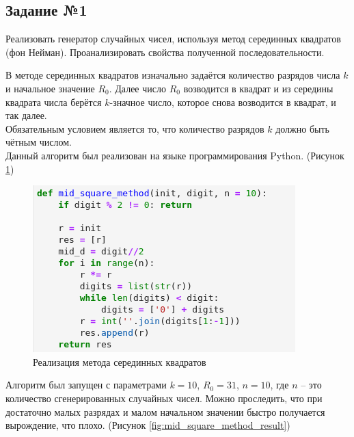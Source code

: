 \documentclass[14pt,fleqn]{extarticle}
\begin{document}
    \subsection*{Задание №1}
    Реализовать генератор случайных чисел, используя метод серединных квадратов (фон Нейман). Проанализировать свойства полученной последовательности.\\
    \newline

    В методе серединных квадратов изначально задаётся количество разрядов числа $k$ и начальное значение $R_0$. Далее число $R_0$ возводится в квадрат и из середины квадрата числа берётся $k$-значное число, которое снова возводится в квадрат, и так далее.\\
    Обязательным условием является то, что количество разрядов $k$ должно быть чётным числом.\\
    \newline
    Данный алгоритм был реализован на языке программирования Python. (Рисунок \ref{fig:mid_square_method_code})
    \begin{figure}[h]
        \centering \includegraphics[scale=0.8]{mid_square_method_code}
        \caption{Реализация метода серединных квадратов}
        \label{fig:mid_square_method_code}
    \end{figure}
    \newpage
    Алгоритм был запущен с параметрами $k = 10$, $R_0 = 31$, $n = 10$, где $n$ -- это количество сгенерированных случайных чисел. Можно проследить, что при достаточно малых разрядах и малом начальном значении быстро получается вырождение, что плохо. (Рисунок \ref{fig:mid_square_method_result})
\end{document}
